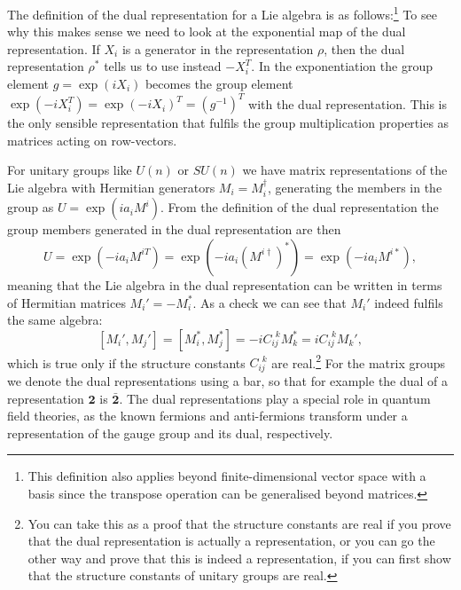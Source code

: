\documentclass[notes.tex]{subfiles}
\begin{document}
The definition of the dual representation for a Lie algebra is as follows:\footnote{This definition also applies beyond finite-dimensional vector space with a basis since the transpose operation can be generalised beyond matrices.}
To see why this makes sense we need to look at the exponential map of the dual representation. If $X_i$ is a generator in the representation $\rho$, then the dual representation $\rho^*$ tells us to use instead $-X_i^T$. In the exponentiation the group element $g=\exp(iX_i)$ becomes the group element $\exp(-iX_i^T)=\exp(-iX_i)^T=(g^{-1})^T$ with the dual representation. This is the only sensible representation that fulfils the group multiplication properties as matrices acting on row-vectors.

For unitary groups like $U(n)$ or $SU(n)$ we have matrix representations of the Lie algebra with Hermitian generators $M_i=M_i^\dagger$,  generating the members in the group as $U=\exp(ia_iM^i)$. From the definition of the dual representation the group members generated in the dual representation are then
\[ U=\exp(-ia_iM^{iT})=\exp(-ia_i(M^{i\dagger})^*)=\exp(-ia_iM^{i*}), \]
meaning that the Lie algebra in the dual representation can be written in terms of Hermitian matrices $M_i'=-M_i^*$. As a check we can see that $M_i'$ indeed fulfils the same algebra:
\[ [M_i',M_j']=[M_i^*,M_j^*]=-iC_{ij}^{~~k}M_k^*=iC_{ij}^{~~k}M_k',\] 
which is true only if the structure constants $C_{ij}^{~~k}$ are real.\footnote{You can take this as a proof that the structure constants are real if you prove that the dual representation is actually a representation, or you can go the other way and prove that this is indeed a representation, if you can first show that the structure constants of unitary groups are real.}
For the matrix groups we denote the dual representations using a bar, so that for example the dual of a representation $\mathbf 2$ is $\mathbf {\bar 2}$. The dual representations play a special role in quantum field theories, as the known fermions and anti-fermions transform under a representation of the gauge group and its dual, respectively.
\end{document}

